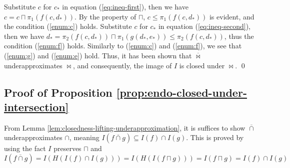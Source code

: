 \documentclass{llncs}
\newcommand{\meet}{\sqcap}
\newcommand{\bowtielift}{\mathbin{\overline{\bowtie}}}
\newcommand{\caplift}{\mathbin{\overline{\cap}}}
\begin{document}
Substitute $c$ for $c_{*}$ in equation (\ref{eq:ineq-first}), then we have $c = c \meet \pi_{1}( f (c , d_{*}))$. By the property of $\meet$, $c \leq \pi_{1}( f (c , d_{*}))$ is evident, and the condition (\ref{enum:c}) holds.
Substitute $c$ for $c_{*}$ in equation (\ref{eq:ineq-second}), then we have $d_{*} = \pi_{2}(f (c , d_{*})) \meet \pi_{1}(g (d_{*} , e_{*})) \leq \pi_{2}(f (c , d_{*}))$, thus the condition (\ref{enum:f}) holds.
Similarly to (\ref{enum:c}) and (\ref{enum:f}), we see that (\ref{enum:g}) and (\ref{enum:e}) hold.
Thus, it has been shown that $\bowtielift$ underapproximates $\bowtie$, and consequently, the image of $I$ is closed under $\bowtie$. \qed

\subsection{Proof of Proposition \ref{prop:endo-closed-under-intersection}}
From Lemma \ref{lem:closedness-lifting-underapproximation}, it is suffices to show $\caplift$ underapproximates $\cap$, meaning $I(f \caplift g) \subseteq I(f) \cap I(g)$.
This is proved by using the fact $I$ preserves $\meet$ and
\[
I(f \caplift g) = I(H(I(f) \cap I(g))) = I(H(I(f \meet g))) = I(f \meet g) = I(f) \cap I(g)
\]
\end{document}
